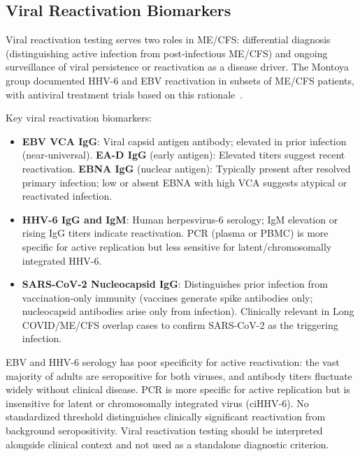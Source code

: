 \subsection{Viral Reactivation Biomarkers}
\label{subsec:viral-reactivation-biomarkers}

Viral reactivation testing serves two roles in ME/CFS: differential diagnosis (distinguishing active infection from post-infectious ME/CFS) and ongoing surveillance of viral persistence or reactivation as a disease driver. The Montoya group documented HHV-6 and EBV reactivation in subsets of ME/CFS patients, with antiviral treatment trials based on this rationale~\cite{Montoya2017}.

Key viral reactivation biomarkers:
\begin{itemize}
    \item \textbf{EBV VCA IgG}: Viral capsid antigen antibody; elevated in prior infection (near-universal). \textbf{EA-D IgG} (early antigen): Elevated titers suggest recent reactivation. \textbf{EBNA IgG} (nuclear antigen): Typically present after resolved primary infection; low or absent EBNA with high VCA suggests atypical or reactivated infection.
    \item \textbf{HHV-6 IgG and IgM}: Human herpesvirus-6 serology; IgM elevation or rising IgG titers indicate reactivation. PCR (plasma or PBMC) is more specific for active replication but less sensitive for latent/chromosomally integrated HHV-6.
    \item \textbf{SARS-CoV-2 Nucleocapsid IgG}: Distinguishes prior infection from vaccination-only immunity (vaccines generate spike antibodies only; nucleocapsid antibodies arise only from infection). Clinically relevant in Long COVID/ME/CFS overlap cases to confirm SARS-CoV-2 as the triggering infection.
\end{itemize}

\begin{limitation}
EBV and HHV-6 serology has poor specificity for active reactivation: the vast majority of adults are seropositive for both viruses, and antibody titers fluctuate widely without clinical disease. PCR is more specific for active replication but is insensitive for latent or chromosomally integrated virus (ciHHV-6). No standardized threshold distinguishes clinically significant reactivation from background seropositivity. Viral reactivation testing should be interpreted alongside clinical context and not used as a standalone diagnostic criterion.
\end{limitation}

